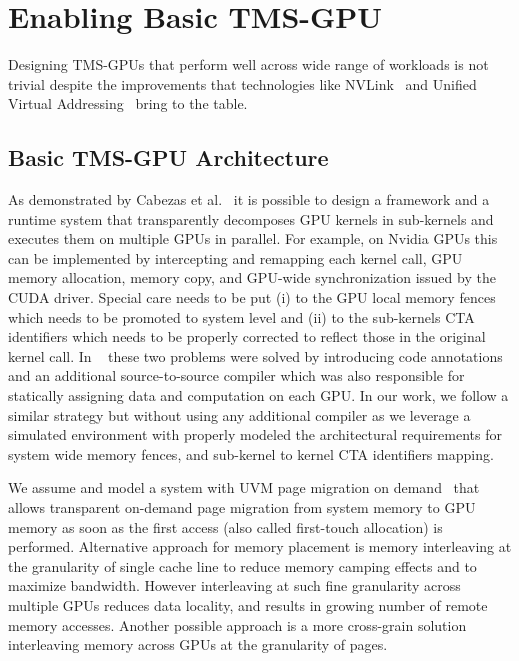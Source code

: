 \section{Enabling Basic TMS-GPU}

Designing TMS-GPUs that 
perform well across wide range of workloads is not trivial despite the 
improvements that technologies like NVLink~\cite{NVLINK} and Unified Virtual 
Addressing~\cite{UVM} bring to the table. 



\subsection{Basic TMS-GPU Architecture}
As demonstrated by Cabezas et al.~\cite{Cabezas2015} it is possible 
to design a framework and a runtime system that transparently decomposes GPU 
kernels in sub-kernels and executes them on multiple GPUs in parallel. For
example, on Nvidia GPUs this can be implemented by intercepting and remapping each kernel 
call, GPU memory allocation, memory copy, and GPU-wide synchronization issued 
by the CUDA driver. Special care needs to be put (i) to the GPU local memory 
fences which needs to be promoted to system level and (ii) to the 
sub-kernels CTA identifiers which needs to be properly corrected to 
reflect those in the original kernel call. 
In ~\cite{Cabezas2015} these two problems were solved by introducing  
code annotations and an additional source-to-source compiler which was also 
responsible for statically assigning data and computation on each GPU. In our 
work, we follow a similar strategy but without using any additional 
compiler as we leverage a simulated environment with properly modeled 
the architectural requirements for system wide memory fences,
and sub-kernel to kernel CTA identifiers mapping. 

We assume and model a system with UVM page migration on demand~\cite{P100} that
allows transparent on-demand page migration from system memory to GPU memory as
soon as the first access (also called first-touch allocation) is performed.
Alternative approach for memory placement is memory interleaving at the
granularity of single cache line to reduce memory camping effects and to
maximize bandwidth. However interleaving at such fine granularity across
multiple GPUs reduces data locality, and results in growing number of remote
memory accesses. Another possible approach is a more cross-grain solution
interleaving memory across GPUs at the granularity of pages. 

